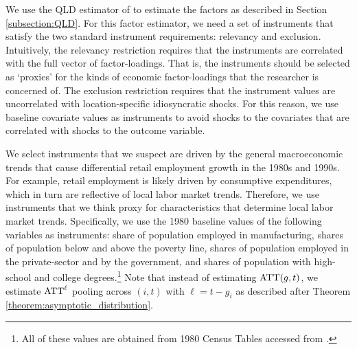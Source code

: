 \documentclass[12pt]{article}
\begin{document}
We use the QLD estimator of \citet{Ahn_Lee_Schmidt_2013} to estimate the factors as described in Section \ref{subsection:QLD}. For this factor estimator, we need a set of instruments that satisfy the two standard instrument requirements: relevancy and exclusion. Intuitively, the relevancy restriction requires that the instruments are correlated with the full vector of factor-loadings. That is, the instruments should be selected as `proxies' for the kinds of economic factor-loadings that the researcher is concerned of. The exclusion restriction requires that the instrument values are uncorrelated with location-specific idiosyncratic shocks. For this reason, we use baseline covariate values as instruments to avoid shocks to the covariates that are correlated with shocks to the outcome variable. 

We select instruments that we suspect are driven by the general macroeconomic trends that cause differential retail employment growth in the 1980s and 1990s. For example, retail employment is likely driven by consumptive expenditures, which in turn are reflective of local labor market trends. Therefore, we use instruments that we think proxy for characteristics that determine local labor market trends. Specifically, we use the 1980 baseline values of the following variables as instruments: share of population employed in manufacturing, shares of population below and above the poverty line, shares of population employed in the private-sector and by the government, and shares of population with high-school and college degrees.\footnote{All of these values are obtained from 1980 Census Tables accessed from \citet{manson2020ipums}.} Note that instead of estimating $\text{ATT}(g,t)$, we estimate $\text{ATT}^\ell$ pooling across $(i, t)$ with $\ell = t - g_i$ as described after Theorem \ref{theorem:asymptotic_distribution}.
\end{document}
